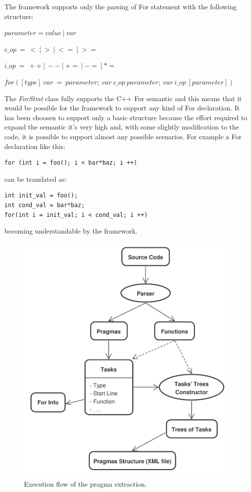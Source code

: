 \documentclass[a4paper,12pt,oneside]{book}
\begin{document}
The framework supports only the parsing of For statement with the following structure: \newline

$parameter = value \ | \ var$

$c\_op \ = \ < \ | \ > \ | \ <= \ | \ >= $

$i\_op \ = \ ++ \ | \ -- \ | \ += \ | \ -= \ | \ *=$ 

$for([type] \ var \ = \ parameter; \ var \ c\_op \ parameter; \ var \ i\_op \ [parameter])$ \newline


The \emph{ForStmt} class fully supports the C++ For semantic and this means that it would be possible for the framework to support any kind of For declaration. It has been choosen to support only a basic structure because the effort required to expand the semantic it’s very high and, with some slightly modification to the code, it is possible to support almost any possible scenarios. For example a For declaration like this: \\

\begin{lstlisting}[language=CCC]
for (int i = foo(); i < bar*baz; i ++)
\end{lstlisting} 
can be translated as: \\

\begin{lstlisting}[language=CCC]
int init_val = foo();
int cond_val = bar*baz;
for(int i = init_val; i < cond_val; i ++)  
\end{lstlisting}
becoming understandable by the framework.

\begin{figure}
\centering
\includegraphics[scale=0.5]{pragma_exctraction.pdf}
\caption{Execution flow of the pragma extraction.}
\end{figure}
\end{document}
